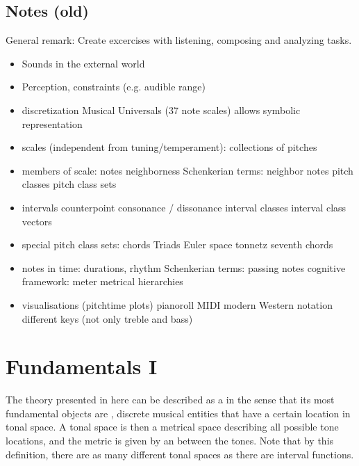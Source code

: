 \documentclass[letterpaper,10pt,english]{sphinxmanual}
\begin{document}
\section{Notes (old)}
\label{\detokenize{0_intro:notes-old}}
General remark: Create excercises with listening, composing and analyzing tasks.
\begin{itemize}
\item {} 
Sounds in the external world

\item {} 
Perception, constraints (e.g. audible range)

\item {} 
discretization
\sphinxhyphen{} Musical Universals (3\sphinxhyphen{}7 note scales)
\sphinxhyphen{} allows symbolic representation

\item {} 
scales (independent from tuning/temperament): collections of pitches

\item {} 
members of scale: notes
\sphinxhyphen{} neighborness
\sphinxhyphen{} Schenkerian terms: neighbor notes
\sphinxhyphen{} pitch classes
\sphinxhyphen{} pitch class sets

\item {} 
intervals
\sphinxhyphen{} counterpoint
\sphinxhyphen{} consonance / dissonance
\sphinxhyphen{} interval classes
\sphinxhyphen{} interval class vectors

\item {} 
special pitch class sets: chords
\sphinxhyphen{} Triads
\sphinxhyphen{} Euler space
\sphinxhyphen{} tonnetz
\sphinxhyphen{} seventh chords

\item {} 
notes in time: durations, rhythm
\sphinxhyphen{} Schenkerian terms: passing notes
\sphinxhyphen{} cognitive framework: meter
\sphinxhyphen{} metrical hierarchies

\item {} 
visualisations (pitch\sphinxhyphen{}time plots)
\sphinxhyphen{} pianoroll
\sphinxhyphen{} MIDI
\sphinxhyphen{} modern Western notation
\sphinxhyphen{} different keys (not only treble and bass)

\end{itemize}


\chapter{Fundamentals I}
\label{\detokenize{1_fundamentals:fundamentals-i}}\label{\detokenize{1_fundamentals::doc}}
The theory presented in here can be described as a  in the sense
that its most fundamental objects are , discrete musical entities that have
a certain location in tonal space.
A tonal space is then a metrical space describing all possible tone locations,
and the metric is given by an  between the tones. Note that by this definition,
there are as many different tonal spaces as there are interval functions.
\end{document}
